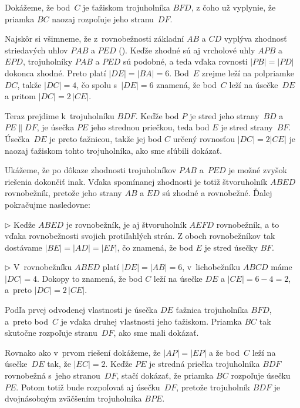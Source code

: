 {%
Dokážeme, že bod~$C$ je ťažiskom trojuholníka $BFD$, z čoho už vyplynie,
že priamka $BC$ naozaj rozpoľuje jeho stranu~$DF$.

Najskôr si všimneme, že z~rovnobežnosti základní $AB$ a $CD$
vyplýva zhodnosť striedavých uhlov $PAB$ a $PED$ (\obr).
Keďže zhodné sú aj vrcholové uhly $APB$ a~$EPD$,
trojuholníky $PAB$ a $PED$ sú podobné, a teda vďaka rovnosti $|PB|=|PD|$
dokonca zhodné. Preto platí $|DE|=|BA|=6$.
Bod~$E$ zrejme leží na polpriamke $DC$, takže $|DC|=4$, čo spolu s~$|DE|=6$ znamená, že
bod~$C$ leží na úsečke~$DE$ a pritom $|DC|=2\,|CE|$.
%

Teraz prejdime k~trojuholníku $BDF$. Keďže bod $P$ je stred
jeho strany~$BD$ a~$PE\parallel DF$, je úsečka $PE$ jeho strednou priečkou,
teda bod $E$ je stred strany~$BF$. Úsečka~$DE$ je preto
ťažnicou, takže jej bod $C$ určený rovnosťou $|DC|=2|CE|$ je naozaj
ťažiskom tohto trojuholníka, ako sme sľúbili dokázať.

\poznamka
Ukážeme, že po dôkaze zhodnosti trojuholníkov $PAB$ a~$PED$ je možné
zvyšok riešenia dokončiť inak. Vďaka spomínanej zhodnosti je totiž
štvoruholník $ABED$ rovnobežník, pretože jeho strany $AB$ a $ED$
sú zhodné a rovnobežné. Ďalej pokračujme nasledovne:

\smallskip
\item{$\triangleright$} Keďže $ABED$ je rovnobežník, je aj štvoruholník $AEFD$
rovnobežník, a to vďaka rovnobežnosti svojich protiľahlých strán.
Z oboch rovnobežníkov tak dostávame $|BE|=|AD|=|EF|$, čo znamená,
že bod $E$ je stred úsečky $BF$.
\item{$\triangleright$} V~rovnobežníku $ABED$ platí $|DE|=|AB|=6$, v~lichobežníku $ABCD$
máme $|DC|=4$. Dokopy to znamená,
že bod $C$ leží na úsečke $DE$ a $|CE|=6-4=2$, a~preto
$|DC|=2\,|CE|$.

\smallskip\noindent
Podľa prvej odvodenej vlastnosti je úsečka $DE$ ťažnica trojuholníka
$BFD$, a~preto bod~$C$ je vďaka druhej vlastnosti jeho
ťažiskom. Priamka $BC$ tak skutočne rozpoľuje stranu~$DF$, ako
sme mali dokázať.

\ineriesenie
Rovnako ako v~prvom riešení dokážeme, že $|AP|=|EP|$
a že bod~$C$ leží na úsečke~$DE$ tak, že $|EC|=2$.
Keďže $PE$ je stredná priečka trojuholníka $BDF$
rovnobežná s~jeho stranou~$DF$, stačí dokázať, že
priamka $BC$ rozpoľuje úsečku~$PE$. Potom totiž bude rozpoľovať
aj úsečku~$DF$, pretože trojuholník $BDF$ je dvojnásobným zväčšením trojuholníka $BPE$.

}
